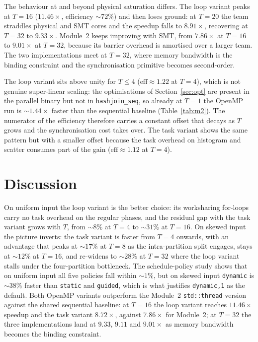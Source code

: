 \documentclass[10pt,twocolumn,a4paper]{article}
\begin{document}
The behaviour at and beyond physical saturation differs. The loop
variant peaks at $T{=}16$ ($11.46\times$, efficiency $\sim 72\%$)
and then loses ground: at $T{=}20$ the team straddles physical and
SMT cores and the speedup falls to $8.91\times$, recovering at
$T{=}32$ to $9.33\times$. Module~2 keeps improving with SMT,
from $7.86\times$ at $T{=}16$ to $9.01\times$ at $T{=}32$, because
its barrier overhead is amortised over a larger team. The two
implementations meet at $T{=}32$, where memory bandwidth is the
binding constraint and the synchronisation primitive becomes
second-order.

The loop variant sits above unity for $T{\le}4$ ($\text{eff}\!\approx\!1.22$
at $T{=}4$), which is not genuine super-linear scaling: the
optimisations of Section~\ref{sec:opt} are present in the parallel
binary but not in \texttt{hashjoin\_seq}, so already at $T{=}1$ the
OpenMP run is $\sim 1.44\times$ faster than the sequential baseline
(Table~\ref{tab:m2}). The numerator of the efficiency therefore
carries a constant offset that decays as $T$ grows and the
synchronisation cost takes over. The task variant shows the same
pattern but with a smaller offset because the task overhead on
histogram and scatter consumes part of the gain
($\text{eff}\!\approx\!1.12$ at $T{=}4$).


\section{Discussion}
On uniform input the loop variant is the better choice: its
worksharing for-loops carry no task overhead on the regular phases,
and the residual gap with the task variant grows with $T$, from
$\sim 8\%$ at $T{=}4$ to $\sim 31\%$ at $T{=}16$. On skewed input
the picture inverts: the task variant is faster from $T{=}4$
onwards, with an advantage that peaks at $\sim 17\%$ at $T{=}8$
as the intra-partition split engages, stays at $\sim 12\%$ at
$T{=}16$, and re-widens to $\sim 28\%$ at $T{=}32$ where the loop
variant stalls under the four-partition bottleneck. The
schedule-policy study shows that on uniform input all five policies
fall within $\sim 1\%$, but on skewed input \texttt{dynamic} is
$\sim 38\%$ faster than \texttt{static} and \texttt{guided}, which
is what justifies \texttt{dynamic,1} as the default. Both OpenMP
variants outperform the Module~2 \texttt{std::thread} version
against the shared sequential baseline: at $T{=}16$ the loop
variant reaches $11.46\times$ speedup and the task variant
$8.72\times$, against $7.86\times$ for Module~2; at $T{=}32$ the
three implementations land at $9.33$, $9.11$ and $9.01\times$ as
memory bandwidth becomes the binding constraint.
\end{document}
